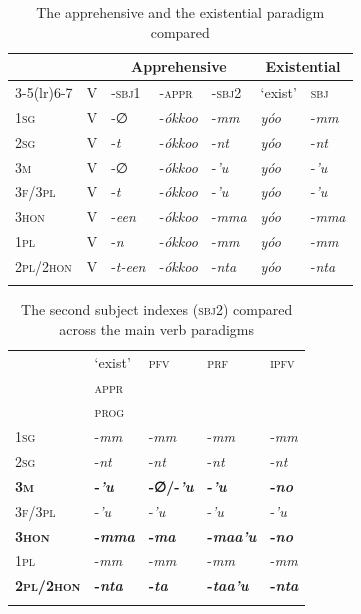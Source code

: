 \documentclass[output=paper,colorlinks,citecolor=brown,
]{langsci/langscibook}
\begin{document}
\begin{table}
    \begin{tabular}{lllll ll}
\lsptoprule
&    &  \multicolumn{3}{c}{Apprehensive}                  & \multicolumn{2}{c}{Existential}\\\cmidrule(lr){3-5}\cmidrule(lr){6-7}
&  V & -\textsc{sbj1} & -\textsc{appr} & -\textsc{sbj2} & `exist' & \textsc{sbj}\\
\midrule
\textsc{1sg} & V & -∅ & -\textit{ókkoo}	& -\textit{mm} & \textit{yóo} & -\textit{mm}\\
\textsc{2sg} & V &	-\textit{t}	& -\textit{ókkoo} & -\textit{nt} & \textit{yóo} & -\textit{nt}\\
\textsc{3m}	& V & -∅ & -\textit{ókkoo}	& -\textit{'u}	& \textit{yóo} & -\textit{'u}\\
\textsc{3f/3pl} & V & -\textit{t} & -\textit{ókkoo} & -\textit{'u} & \textit{yóo} & -\textit{'u}\\
\textsc{3hon} & V & -\textit{een} &	-\textit{ókkoo} & -\textit{mma} & \textit{yóo} & 	-\textit{mma}\\
\textsc{1pl} & V & 	-\textit{n} & -\textit{ókkoo} & -\textit{mm} & \textit{yóo} & -\textit{mm}\\
\textsc{2pl/2hon} & V &	-\textit{t-een} & -\textit{ókkoo} & -\textit{nta} & \textit{yóo} & -\textit{nta}\\
\lspbottomrule
\end{tabular}
    \caption{The apprehensive and the existential paradigm compared}
    \label{tab:treis:4}
\end{table}

\begin{table}
    \begin{tabular}{lllll}
\lsptoprule
&  `exist' & \textsc{pfv} & \textsc{prf} & \textsc{ipfv}\\
&  \textsc{appr} & & & \\
&  \textsc{prog} & & & \\
\midrule
\textsc{1sg} & -\textit{mm} & -\textit{mm} & -\textit{mm} & -\textit{mm} \\
\textsc{2sg} & -\textit{nt} & -\textit{nt} & -\textit{nt} & -\textit{nt} \\
\textbf{\textsc{3m}} & \textbf{-\textit{'u}} & \textbf{-∅\slash -\textit{'u}} & \textbf{-\textit{'u}}	& \textbf{-\textit{no}}\\
\textsc{3f/3pl} & -\textit{'u} & -\textit{'u} & -\textit{'u} & -\textit{'u}\\
\textbf{\textsc{3hon}} & \textbf{-\textit{mma}} & \textbf{-\textit{ma}} & \textbf{-\textit{maa'u}} & \textbf{-\textit{no}}\\
\textsc{1pl} & -\textit{mm} & -\textit{mm} & -\textit{mm} & -\textit{mm}\\
\textbf{\textsc{2pl/2hon}} & \textbf{-\textit{nta}} & \textbf{-\textit{ta}} & \textbf{-\textit{taa'u}} & \textbf{-\textit{nta}}\\
\lspbottomrule
\end{tabular}
    \caption{The second subject indexes (\textsc{sbj2}) compared across the main verb paradigms}
    \label{tab:treis:5}
\end{table}
\end{document}
